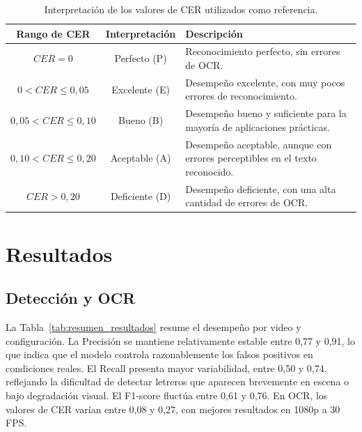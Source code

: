 \documentclass[conference]{IEEEtran}
\begin{document}
\begin{table}[!t]
\caption{Interpretación de los valores de CER utilizados como referencia.}
\label{tab:cer_interpretacion}
\centering
\footnotesize
\setlength{\tabcolsep}{4pt}
\begin{tabular}{cc p{3.1cm}}
\toprule
Rango de CER & Interpretación & Descripción \\
\midrule
$CER = 0$ & Perfecto (P) & Reconocimiento perfecto, sin errores de OCR. \\
$0 < CER \leq 0{,}05$ & Excelente (E) & Desempeño excelente, con muy pocos errores de reconocimiento. \\
$0{,}05 < CER \leq 0{,}10$ & Bueno (B) & Desempeño bueno y suficiente para la mayoría de aplicaciones prácticas. \\
$0{,}10 < CER \leq 0{,}20$ & Aceptable (A) & Desempeño aceptable, aunque con errores perceptibles en el texto reconocido. \\
$CER > 0{,}20$ & Deficiente (D) & Desempeño deficiente, con una alta cantidad de errores de OCR. \\
\bottomrule
\end{tabular}
\end{table}

\section{Resultados}

\subsection{Detección y OCR}

La Tabla~\ref{tab:resumen_resultados} resume el desempeño por video y 
configuración. La Precisión se mantiene relativamente estable entre 0,77 y
0,91, lo que indica que el modelo controla razonablemente los falsos 
positivos en condiciones reales. El Recall presenta mayor variabilidad, 
entre 0,50 y 0,74, reflejando la dificultad de detectar letreros que 
aparecen brevemente en escena o bajo degradación visual. El F1-score 
fluctúa entre 0,61 y 0,76. En OCR, los valores de CER varían entre 0,08 
y 0,27, con mejores resultados en 1080p a 30 FPS.
\end{document}

